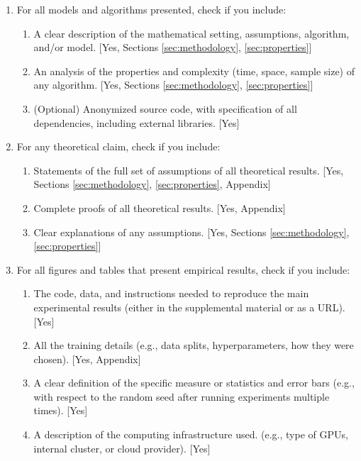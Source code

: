 \documentclass[twoside]{article}
\begin{document}
 \begin{enumerate}


 \item For all models and algorithms presented, check if you include:
 \begin{enumerate}
   \item A clear description of the mathematical setting, assumptions, algorithm, and/or model. [Yes, Sections \ref{sec:methodology}, \ref{sec:properties}]
   \item An analysis of the properties and complexity (time, space, sample size) of any algorithm. [Yes, Sections \ref{sec:methodology}, \ref{sec:properties}]
   \item (Optional) Anonymized source code, with specification of all dependencies, including external libraries. [Yes]
 \end{enumerate}


 \item For any theoretical claim, check if you include:
 \begin{enumerate}
   \item Statements of the full set of assumptions of all theoretical results. [Yes, Sections \ref{sec:methodology}, \ref{sec:properties}, Appendix]
   \item Complete proofs of all theoretical results. [Yes, Appendix]
   \item Clear explanations of any assumptions. [Yes, Sections \ref{sec:methodology}, \ref{sec:properties}]     
 \end{enumerate}


 \item For all figures and tables that present empirical results, check if you include:
 \begin{enumerate}
   \item The code, data, and instructions needed to reproduce the main experimental results (either in the supplemental material or as a URL). [Yes]
   \item All the training details (e.g., data splits, hyperparameters, how they were chosen). [Yes, Appendix]
         \item A clear definition of the specific measure or statistics and error bars (e.g., with respect to the random seed after running experiments multiple times). [Yes]
         \item A description of the computing infrastructure used. (e.g., type of GPUs, internal cluster, or cloud provider). [Yes]
 \end{enumerate}


\end{enumerate}
\end{document}
